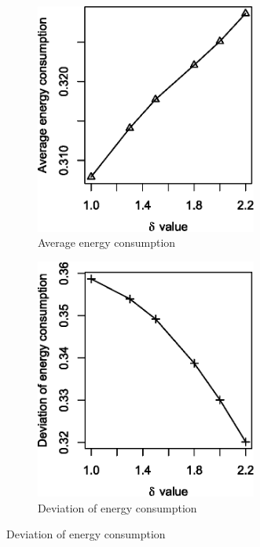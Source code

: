 \begin{figure}[!htb]
\centering
\begin{subfigure}{0.5\textwidth}
  \centering
  \includegraphics[width=0.8\textwidth]{Chapter7/Chapter7Figs/nhr-energy-plot.eps}
  \caption{Average energy consumption}
\end{subfigure}%
\begin{subfigure}{0.5\textwidth}
  \centering
  \includegraphics[width=0.8\textwidth]{Chapter7/Chapter7Figs/nhr-dev-plot.eps}
  \caption{Deviation of energy consumption}

\end{subfigure}
\end{figure}
